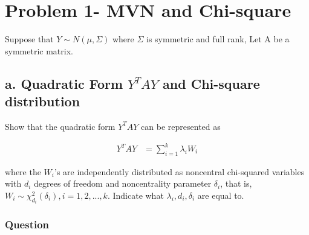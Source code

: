 
\section{Problem 1- MVN and Chi-square}
	Suppose that $Y \sim N(\mu, \Sigma)$ where $\Sigma$ is symmetric and full rank,  Let A be a symmetric matrix.
	
\subsection{a. Quadratic Form $Y^T A Y$ and Chi-square distribution}
	Show that the quadratic form $Y^T A Y$ can be represented as

	\begin{align*}
		Y^T A Y &= \sum_{i=1}^k \lambda_i W_i
	\end{align*}	

	where the $W_i$’s are independently distributed as noncentral chi-squared variables	with $d_i$ degrees of freedom and noncentrality parameter $\delta_i$, that is, $W_i \sim \chi^2_	{d_i}(\delta_i), i =1, 2, ..., k$. Indicate what $\lambda_i, d_i, \delta_i$ are equal to.
	
\subsubsection{Question}

